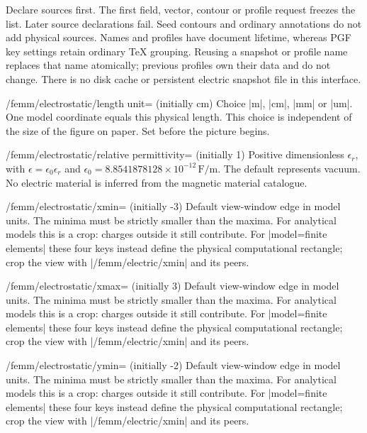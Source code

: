 Declare sources first. The first field, vector, contour or profile request
freezes the list. Later source declarations fail. Seed contours and ordinary
annotations do not add physical sources. Names and profiles have document
lifetime, whereas PGF key settings retain ordinary TeX grouping. Reusing a
snapshot or profile name replaces that name atomically; previous profiles own
their data and do not change. There is no disk cache or persistent electric
snapshot file in this interface.

\begin{key}{/femm/electrostatic/length unit= (initially cm)}
Choice |m|, |cm|, |mm| or |um|. One model coordinate equals this physical
length. This choice is independent of the size of the figure on paper.
Set before the picture begins.
\end{key}

\begin{key}{/femm/electrostatic/relative permittivity= (initially 1)}
Positive dimensionless $\epsilon_r$, with
$\epsilon=\epsilon_0\epsilon_r$ and
$\epsilon_0=8.8541878128\times10^{-12}\,\mathrm{F/m}$.
The default represents vacuum. No electric material is inferred from the
magnetic material catalogue.
\end{key}

\begin{key}{/femm/electrostatic/xmin= (initially -3)}
Default view-window edge in model units. The minima must be strictly smaller
than the maxima. For analytical models this is a crop: charges outside it still contribute.
For |model=finite elements| these four keys instead define the physical
computational rectangle; crop the view with |/femm/electric/xmin| and its peers.
\end{key}

\begin{key}{/femm/electrostatic/xmax= (initially 3)}
Default view-window edge in model units. The minima must be strictly smaller
than the maxima. For analytical models this is a crop: charges outside it still contribute.
For |model=finite elements| these four keys instead define the physical
computational rectangle; crop the view with |/femm/electric/xmin| and its peers.
\end{key}

\begin{key}{/femm/electrostatic/ymin= (initially -2)}
Default view-window edge in model units. The minima must be strictly smaller
than the maxima. For analytical models this is a crop: charges outside it still contribute.
For |model=finite elements| these four keys instead define the physical
computational rectangle; crop the view with |/femm/electric/xmin| and its peers.
\end{key}

